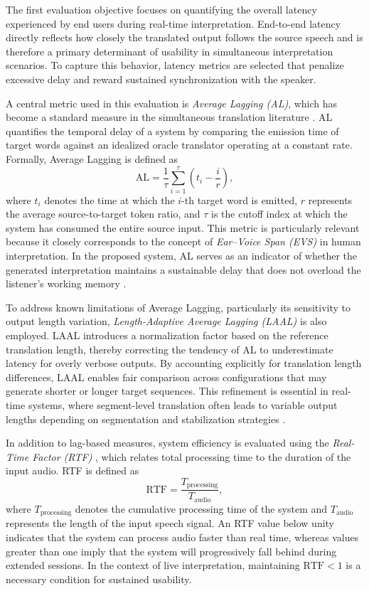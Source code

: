 The first evaluation objective focuses on quantifying the overall latency experienced by end users during real-time interpretation. End-to-end latency directly reflects how closely the translated output follows the source speech and is therefore a primary determinant of usability in simultaneous interpretation scenarios. To capture this behavior, latency metrics are selected that penalize excessive delay and reward sustained synchronization with the speaker.

A central metric used in this evaluation is \emph{Average Lagging (AL)}, which has become a standard measure in the simultaneous translation literature \cite{papi-etal-2022-laal}. AL quantifies the temporal delay of a system by comparing the emission time of target words against an idealized oracle translator operating at a constant rate. Formally, Average Lagging is defined as
\begin{equation}
\text{AL} = \frac{1}{\tau} \sum_{i=1}^{\tau} \left( t_i - \frac{i}{r} \right),
\end{equation}
where $t_i$ denotes the time at which the $i$-th target word is emitted, $r$ represents the average source-to-target token ratio, and $\tau$ is the cutoff index at which the system has consumed the entire source input. This metric is particularly relevant because it closely corresponds to the concept of \emph{Ear--Voice Span (EVS)} in human interpretation. In the proposed system, AL serves as an indicator of whether the generated interpretation maintains a sustainable delay that does not overload the listener’s working memory \cite{papi-etal-2022-laal}.

To address known limitations of Average Lagging, particularly its sensitivity to output length variation, \emph{Length-Adaptive Average Lagging (LAAL)} \cite{papi2022evaluation} is also employed. LAAL introduces a normalization factor based on the reference translation length, thereby correcting the tendency of AL to underestimate latency for overly verbose outputs. By accounting explicitly for translation length differences, LAAL enables fair comparison across configurations that may generate shorter or longer target sequences. This refinement is essential in real-time systems, where segment-level translation often leads to variable output lengths depending on segmentation and stabilization strategies \cite{ma2019staclarxiv, papi2022evaluation}.

In addition to lag-based measures, system efficiency is evaluated using the \emph{Real-Time Factor (RTF)} \cite{arriaga2025assessing}, which relates total processing time to the duration of the input audio. RTF is defined as
\begin{equation}
\text{RTF} = \frac{T_{\text{processing}}}{T_{\text{audio}}},
\end{equation}
where $T_{\text{processing}}$ denotes the cumulative processing time of the system and $T_{\text{audio}}$ represents the length of the input speech signal. An RTF value below unity indicates that the system can process audio faster than real time, whereas values greater than one imply that the system will progressively fall behind during extended sessions. In the context of live interpretation, maintaining $\text{RTF} < 1$ is a necessary condition for sustained usability.


